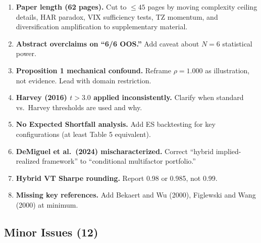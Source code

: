 \documentclass[12pt,a4paper]{article}
\begin{document}
\begin{enumerate}[label=M\arabic*.]
\item \textbf{Paper length (62 pages).} Cut to $\leq 45$ pages by moving complexity ceiling details, HAR paradox, VIX sufficiency tests, TZ momentum, and diversification amplification to supplementary material.

\item \textbf{Abstract overclaims on ``6/6 OOS.''} Add caveat about $N = 6$ statistical power.

\item \textbf{Proposition 1 mechanical confound.} Reframe $\rho = 1.000$ as illustration, not evidence. Lead with domain restriction.

\item \textbf{Harvey (2016) $t > 3.0$ applied inconsistently.} Clarify when standard vs.\ Harvey thresholds are used and why.

\item \textbf{No Expected Shortfall analysis.} Add ES backtesting for key configurations (at least Table 5 equivalent).

\item \textbf{DeMiguel et al.\ (2024) mischaracterized.} Correct ``hybrid implied-realized framework'' to ``conditional multifactor portfolio.''

\item \textbf{Hybrid VT Sharpe rounding.} Report 0.98 or 0.985, not 0.99.

\item \textbf{Missing key references.} Add Bekaert and Wu (2000), Figlewski and Wang (2000) at minimum.
\end{enumerate}

\subsection*{Minor Issues (12)}
\end{document}

